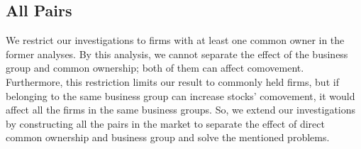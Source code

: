 %						
			
		

				
				
				\FloatBarrier
				
				\subsection{All Pairs}
				
We restrict our investigations to firms with at least one common owner in the former analyses. By this analysis, we cannot separate the effect of the business group and common ownership; both of them can affect comovement. Furthermore, this restriction limits our result to commonly held firms, but if belonging to the same business group can increase stocks' comovement, it would affect all the firms in the same business groups. 	So, we extend our investigations by constructing all the pairs in the market to separate the effect of direct common ownership and business group and solve the mentioned problems. 
	
